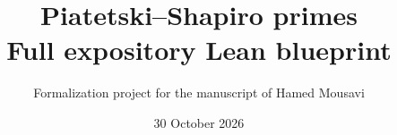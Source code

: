 
\newif\ifDetailed\Detailedtrue
\title{Piatetski--Shapiro primes\\Full expository Lean blueprint}
\author{Formalization project for the manuscript of Hamed Mousavi}
\date{30 October 2026}

\maketitle
\tableofcontents


